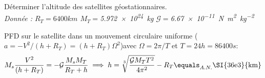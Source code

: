 \begin{Exercise}[title=Satellite Géostationnaire]
	\Question Déterminer l'altitude des satellites géostationnaires.\\
	\emph{Donnée : $R_T=6400 km$ $M_T=$\SI{5,972e24}{\kg} $\mathcal{G}=$\SI{6.67e-11}{\N\m^{2}\kg^{-2}}}
\end{Exercise}
\begin{Answer}
  PFD sur le satellite dans un mouvement circulaire uniforme ($a =-V^2/(h+R_T) = (h+R_T)\Omega^2$)avec $\Omega = 2\pi/T$ et $T=24h=86400s$:
  \[
    M_s \frac{V^2}{(h+R_T)} = -\mathcal{G}\frac{M_sM_T}{R_T+h} \implies h = \sqrt[3]{\frac{\mathcal{G}M_TT^2}{4\pi^2}} -R_T \equals_{A.N.} \text{\SI{36e3}{km}}
  \]
\end{Answer}

